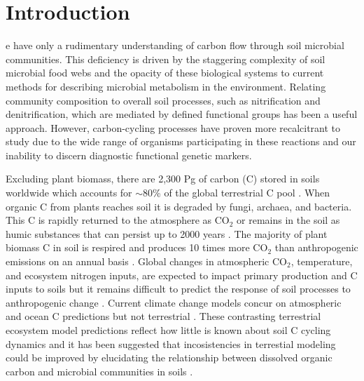 \section{Introduction}
e have only a rudimentary understanding of carbon flow through soil microbial communities. This deficiency is driven by the staggering complexity of soil microbial food webs and the opacity of these biological systems to current methods for describing microbial metabolism in the environment. Relating community composition to overall soil processes, such as nitrification and denitrification, which are mediated by defined functional groups has been a useful approach. However, carbon-cycling processes have proven more recalcitrant to study due to the wide range of organisms participating in these reactions and our inability to discern diagnostic functional genetic markers.

Excluding plant biomass, there are 2,300 Pg of carbon (C) stored in soils worldwide which accounts for $\sim$80\% of the global terrestrial C pool \citep{Amundson_2001,BATJES_1996}. When organic C from plants reaches soil it is degraded by fungi, archaea, and bacteria. This C is rapidly returned to the atmosphere as CO$_{2}$ or remains in the soil as humic substances that can persist up to 2000 years \citep{yanagita1990natural}. The majority of plant biomass C in soil is respired and produces 10 times more CO$_{2}$ than anthropogenic emissions on an annual basis \citep{chapin2002principles}. Global changes in atmospheric CO$_{2}$, temperature, and ecosystem nitrogen inputs, are expected to impact primary production and C inputs to soils \citep{Groenigen_2006} but it remains difficult to predict the response of soil processes to anthropogenic change \citep{DAVIDSON_2006}. Current climate change models concur on atmospheric and ocean C predictions but not terrestrial \citep{Friedlingstein_2006}. These contrasting terrestrial ecosystem model predictions reflect how little is known about soil C cycling dynamics and it has been suggested that incosistencies in terrestial modeling could be improved by elucidating the relationship between dissolved organic carbon and microbial communities in soils \citep{Neff_2001}. 

